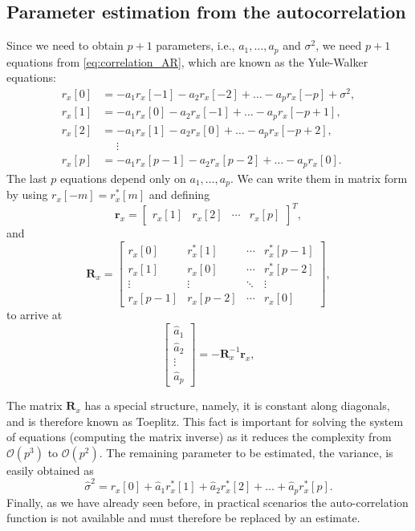 \subsection{Parameter estimation from the autocorrelation}

Since we need to obtain $p+1$ parameters, i.e., $a_1, \ldots, a_p$ and $\sigma^2$, we need $p+1$ equations from \eqref{eq:correlation_AR}, which are known as the Yule-Walker equations:
\begin{align*}
r_x[0] &= -a_1 r_x[-1] - a_2 r_x[-2] + \ldots -a_p r_x[-p] + \sigma^2, \\
r_x[1] &= -a_1 r_x[0] - a_2 r_x[-1] + \ldots -a_p r_x[-p+1], \\
r_x[2] &= -a_1 r_x[1] - a_2 r_x[0] + \ldots -a_p r_x[-p+2], \\
	&\phantom{=} \vdots \\
r_x[p] &= -a_1 r_x[p-1] - a_2 r_x[p-2] + \ldots -a_p r_x[0].
\end{align*}
The last $p$ equations depend only on $a_1, \ldots, a_p$. We can write them in matrix form by using $r_{x}[-m] = r_{x}^{\ast}[m]$ and defining
\begin{equation*}
\mathbf{r}_x = \begin{bmatrix}
r_x[1] & r_x[2] & \cdots & r_x[p]
\end{bmatrix}^T,
\end{equation*}
and
\begin{equation*}
\mathbf{R}_x  =\begin{bmatrix}
r_x[0] & r_x^{\ast}[1] & \cdots & r_x^{\ast}[p-1] \\
r_x[1] & r_x[0] & \cdots & r_x^{\ast}[p-2] \\
\vdots & \vdots & \ddots & \vdots \\
r_x[p-1] & r_x[p-2] & \cdots & r_x[0] 
\end{bmatrix},
\end{equation*}
to arrive at
\begin{equation*}
\begin{bmatrix}
\hat{a}_1 \\ \hat{a}_2 \\ \vdots \\ \hat{a}_p
\end{bmatrix} = - \mathbf{R}_x^{-1} \mathbf{r}_x,
\end{equation*}

The matrix $\mathbf{R}_x$ has a special structure, namely, it is constant along diagonals, and is therefore known as Toeplitz. This fact is important for solving the system of equations (computing the matrix inverse) as it reduces the complexity from $\mathcal{O}(p^3)$ to $\mathcal{O}(p^2)$. The remaining parameter to be estimated, the variance, is easily obtained as
\begin{equation*}
\hat{\sigma}^2 = r_x[0] + \hat{a}_1 r_x^{\ast}[1] + \hat{a}_2 r_x^{\ast}[2] + \ldots + \hat{a}_p r_x^{\ast}[p].
\end{equation*}
Finally, as we have already seen before, in practical scenarios the auto-correlation function is not available and must therefore be replaced by an estimate.


